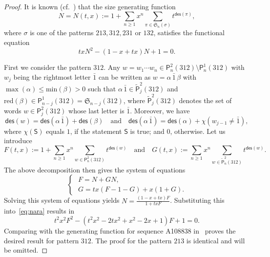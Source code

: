 \documentclass[12pt]{amsart}
\numberwithin{equation}{section}
\theoremstyle{plain}
\theoremstyle{definition}
\renewcommand\P{\mathsf{P}}
\def\reduction{\mathrm{red}}
\def\max{\mathrm{max}}
\def\min{\mathrm{min}}
\def\des{\mathsf{des}}
\def\S{\mathfrak{S}}
\def\max{\operatorname{max}}
\def\neg#1{{{{\bar#1}}}}
\begin{document}
\begin{proof}
It is known (cf.~\cite[Sec.~2.3]{pe}) that the size generating function 
$$
N=N(t,x):=1+\sum_{n\geq1}x^n\sum_{\pi\in\S_n(\sigma)}t^{\des(\pi)},
$$
where $\sigma$ is one of the patterns $213,312,231$ or $132$, satisfies the functional equation 
\begin{equation}\label{eq:nara}
txN^2-(1-x+tx)N+1=0.
\end{equation}

First we consider the pattern $312$. Any $w=w_1\cdots w_n\in\P_n^2(312)\setminus\P_n^1(312)$ with $w_j$ being the rightmost letter $\neg1$  can be written as $w=\alpha\,\neg1\,\beta$ with $\max(\alpha)\leq \min(\beta)>0$ such that $\alpha\,\neg1\in\tilde{\P}_{j}^2(312)$ and $\reduction(\beta)\in\P_{n-j}^1(312)=\S_{n-j}(312)$, where $\tilde{\P}_j^2(312)$ denotes the set of words $w\in\P_j^2(312)$ whose last letter is $\neg1$. Moreover, we have 
$$
\des(w)=\des(\alpha\,\neg1)+\des(\beta)\quad\text{and}\quad\des(\alpha\,\neg1)=\des(\alpha)+\chi(w_{j-1}\neq\neg1),
$$
where $\chi(\mathsf{S})$ equals $1$, if the statement $\mathsf{S}$ is true; and $0$, otherwise. Let us introduce 
$$
F(t,x):=1+\sum_{n\geq1}x^n\sum_{w\in\P_n^2(312)}t^{\des(w)}\quad\text{and} \quad G(t,x):=\sum_{n\geq1}x^n\sum_{w\in\tilde{\P}_n^2(312)}t^{\des(w)}.
$$
 The above decomposition then gives the system of equations
$$
\begin{cases}
\,\,F=N+GN,
\\
\,\,G=tx(F-1-G)+x(1+G).
\end{cases}
$$
Solving this system of equations yields $N=\frac{(1-x+tx)F}{1+txF}$. Substituting this into~\eqref{eq:nara} results in
\begin{equation}\label{eq:312}
t^2x^2F^2-(t^2x^2-2tx^2+x^2-2x+1)F+1=0.
\end{equation}
Comparing with the generating function for sequence A108838 in~\cite{oeis} proves the desired result for pattern $312$. The proof for the pattern $213$ is identical and will be omitted. 


\end{proof}
\end{document}
